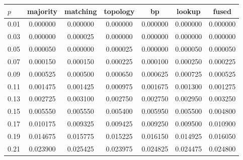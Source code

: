 \begin{tabular}{lcccccc}
\toprule
$p$ & majority & matching & topology & bp & lookup & fused \\
\midrule
0.01 & 0.000000 & 0.000000 & 0.000000 & 0.000000 & 0.000000 & 0.000000 \\
0.03 & 0.000000 & 0.000025 & 0.000000 & 0.000000 & 0.000000 & 0.000000 \\
0.05 & 0.000050 & 0.000000 & 0.000025 & 0.000000 & 0.000050 & 0.000050 \\
0.07 & 0.000150 & 0.000150 & 0.000225 & 0.000100 & 0.000250 & 0.000225 \\
0.09 & 0.000525 & 0.000500 & 0.000650 & 0.000625 & 0.000725 & 0.000525 \\
0.11 & 0.001475 & 0.001425 & 0.000975 & 0.001675 & 0.001300 & 0.001275 \\
0.13 & 0.002725 & 0.003100 & 0.002750 & 0.002750 & 0.002950 & 0.003250 \\
0.15 & 0.005550 & 0.005550 & 0.005400 & 0.005950 & 0.005500 & 0.004800 \\
0.17 & 0.010175 & 0.009325 & 0.009425 & 0.009250 & 0.009500 & 0.010900 \\
0.19 & 0.014675 & 0.015775 & 0.015225 & 0.016150 & 0.014925 & 0.016050 \\
0.21 & 0.023900 & 0.025425 & 0.023975 & 0.024825 & 0.024475 & 0.024800 \\
\bottomrule
\end{tabular}
